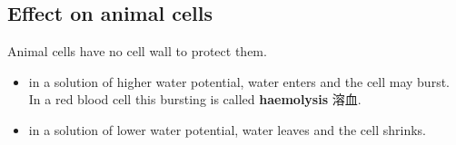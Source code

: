 \documentclass[11pt]{article}
\begin{document}
\subsection*{Effect on animal cells}

Animal cells have no cell wall to protect them.

\begin{itemize}
\item in a solution of higher water potential, water enters and the cell may burst. In a red blood cell this bursting is called \textbf{haemolysis} 溶血.

\item in a solution of lower water potential, water leaves and the cell shrinks.

\end{itemize}
\end{document}
